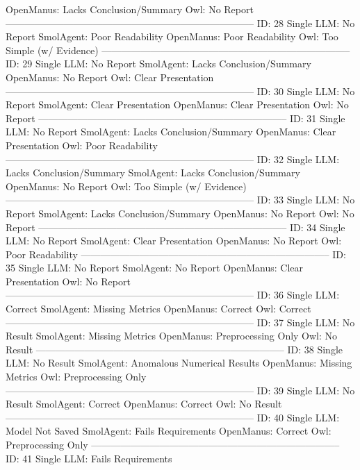\begin{tcolorbox}[colback=cadmiumgreen!5!white,colframe=forestgreen!75!white,breakable,title=\textit{Human evaluation results in task 4.}]
\begin{VerbatimWrap}
OpenManus: Lacks Conclusion/Summary 
Owl: No Report 
-----------------------------------------------------------------------------
ID: 28 
Single LLM: No Report 
SmolAgent: Poor Readability 
OpenManus: Poor Readability 
Owl: Too Simple (w/ Evidence) 
-----------------------------------------------------------------------------
ID: 29 
Single LLM: No Report 
SmolAgent: Lacks Conclusion/Summary 
OpenManus: No Report 
Owl: Clear Presentation 
-----------------------------------------------------------------------------
ID: 30 
Single LLM: No Report 
SmolAgent: Clear Presentation 
OpenManus: Clear Presentation 
Owl: No Report 
-----------------------------------------------------------------------------
ID: 31 
Single LLM: No Report 
SmolAgent: Lacks Conclusion/Summary 
OpenManus: Clear Presentation 
Owl: Poor Readability 
-----------------------------------------------------------------------------
ID: 32 
Single LLM: Lacks Conclusion/Summary 
SmolAgent: Lacks Conclusion/Summary 
OpenManus: No Report 
Owl: Too Simple (w/ Evidence) 
-----------------------------------------------------------------------------
ID: 33 
Single LLM: No Report 
SmolAgent: Lacks Conclusion/Summary 
OpenManus: No Report 
Owl: No Report 
-----------------------------------------------------------------------------
ID: 34 
Single LLM: No Report 
SmolAgent: Clear Presentation 
OpenManus: No Report 
Owl: Poor Readability 
-----------------------------------------------------------------------------
ID: 35 
Single LLM: No Report 
SmolAgent: No Report 
OpenManus: Clear Presentation 
Owl: No Report 
-----------------------------------------------------------------------------
ID: 36 
Single LLM: Correct 
SmolAgent: Missing Metrics 
OpenManus: Correct 
Owl: Correct 
-----------------------------------------------------------------------------
ID: 37 
Single LLM: No Result 
SmolAgent: Missing Metrics 
OpenManus: Preprocessing Only 
Owl: No Result 
-----------------------------------------------------------------------------
ID: 38 
Single LLM: No Result 
SmolAgent: Anomalous Numerical Results 
OpenManus: Missing Metrics 
Owl: Preprocessing Only 
-----------------------------------------------------------------------------
ID: 39 
Single LLM: No Result 
SmolAgent: Correct 
OpenManus: Correct 
Owl: No Result 
-----------------------------------------------------------------------------
ID: 40 
Single LLM: Model Not Saved 
SmolAgent: Fails Requirements 
OpenManus: Correct 
Owl: Preprocessing Only 
-----------------------------------------------------------------------------
ID: 41 
Single LLM: Fails Requirements 

\end{VerbatimWrap}
\end{tcolorbox}
